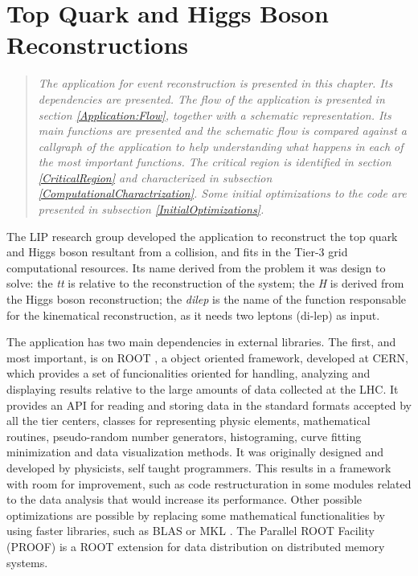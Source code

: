 \chapter{Top Quark and Higgs Boson Reconstructions}
\label{Application}

\begin{quote}
\textit{The \tth application for event reconstruction is presented in this chapter. Its dependencies are presented. The flow of the application is presented in section \ref{Application:Flow}, together with a schematic representation. Its main functions are presented and the schematic flow is compared against a callgraph of the application to help understanding what happens in each of the most important functions. The critical region is identified in section \ref{CriticalRegion} and characterized in subsection \ref{ComputationalCharactrization}. Some initial optimizations to the code are presented in subsection \ref{InitialOptimizations}.}
\end{quote}

The LIP research group developed the \tth application to reconstruct the top quark and Higgs boson resultant from a collision, and fits in the Tier-3 grid computational resources. Its name derived from the problem it was design to solve: the \textit{tt} is relative to the reconstruction of the \ttbar system; the \textit{H} is derived from the Higgs boson reconstruction; the \textit{dilep} is the name of the function responsable for the kinematical reconstruction, as it needs two leptons (di-lep) as input.

The application has two main dependencies in external libraries. The first, and most important, is on ROOT \cite{CERN:ROOT}, a object oriented framework, developed at CERN, which provides a set of funcionalities oriented for handling, analyzing and displaying results relative to the large amounts of data collected at the LHC. It provides an API for reading and storing data in the standard formats accepted by all the tier centers, classes for representing physic elements, mathematical routines, pseudo-random number generators, histograming, curve fitting minimization and data visualization methods. It was originally designed and developed by physicists, self taught programmers. This results in a framework with room for improvement, such as code restructuration in some modules related to the data analysis that would increase its performance. Other possible optimizations are possible by replacing some mathematical functionalities by using faster libraries, such as BLAS \cite{BLAS} or MKL \cite{MKL}. The Parallel ROOT Facility (PROOF) \cite{CERN:PROOF} is a ROOT extension for data distribution on distributed memory systems.

